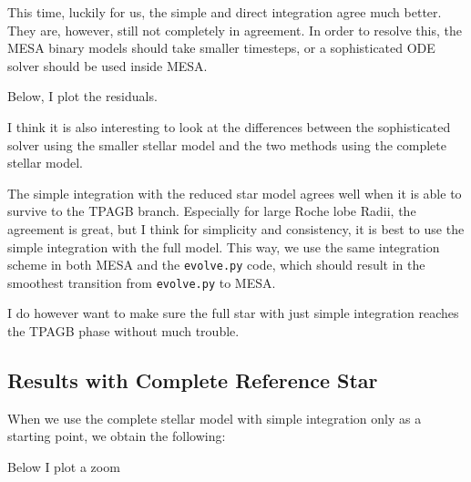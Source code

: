 \documentclass[a4paper,10pt]{article}
\begin{document}
\begin{figure}[ht]
    \centering
\end{figure}

This time, luckily for us, the simple and direct integration agree much better. They are, however, still not completely in agreement. In order to resolve this, the MESA binary models should take smaller timesteps, or a sophisticated ODE solver should be used inside MESA.

Below, I plot the residuals.
\begin{figure}[ht]
    \centering
\end{figure}

I think it is also interesting to look at the differences between the sophisticated solver using the smaller stellar model and the two methods using the complete stellar model.

\begin{figure}[ht]
    \centering
\end{figure}

The simple integration with the reduced star model agrees well when it is able to survive to the TPAGB branch. Especially for large Roche lobe Radii, the agreement is great, but I think for simplicity and consistency, it is best to use the simple integration with the full model. This way, we use the same integration scheme in both MESA and the \lstinline[style=output, breaklines=true]|evolve.py| code, which should result in the smoothest transition from \lstinline[style=output, breaklines=true]|evolve.py| to MESA.

\nextpage
I do however want to make sure the full star with just simple integration reaches the TPAGB phase without much trouble.

\begin{figure}[ht]
    \centering
\end{figure}

\subsection{Results with Complete Reference Star}
When we use the complete stellar model with simple integration only as a starting point, we obtain the following:
\begin{figure}[ht]
    \centering
\end{figure}
Below I plot a zoom
\begin{figure}[ht]
    \centering
\end{figure}
\end{document}
